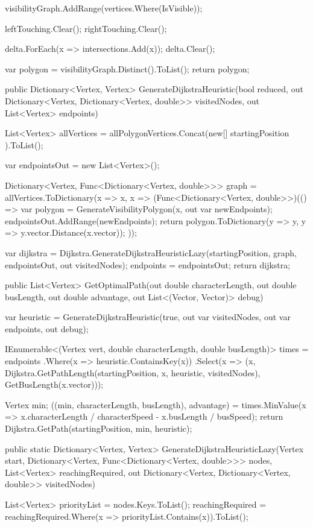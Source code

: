 \documentclass[12pt]{article}
\begin{document}
\begin{Csharp}[caption=class Map]
\begin{Csharp}
{{        visibilityGraph.AddRange(vertices.Where(IsVisible));

        leftTouching.Clear();
        rightTouching.Clear();

        delta.ForEach(x => intersections.Add(x));
        delta.Clear();
    }

    var polygon = visibilityGraph.Distinct().ToList();
    return polygon;
}

public Dictionary<Vertex, Vertex> GenerateDijkstraHeuristic(bool reduced, out Dictionary<Vertex, Dictionary<Vertex, double>> visitedNodes, out List<Vertex> endpoints)
{
    List<Vertex> allVertices = allPolygonVertices.Concat(new[] { startingPosition }).ToList();

    var endpointsOut = new List<Vertex>();

    Dictionary<Vertex, Func<Dictionary<Vertex, double>>> graph =
        allVertices.ToDictionary(x => x, x =>
        (Func<Dictionary<Vertex, double>>)(() =>
            {
                var polygon = GenerateVisibilityPolygon(x, out var newEndpoints);
                endpointsOut.AddRange(newEndpoints);
                return polygon.ToDictionary(y => y, y => y.vector.Distance(x.vector));
            }
        ));

    var dijkstra = Dijkstra.GenerateDijkstraHeuristicLazy(startingPosition, graph, endpointsOut, out visitedNodes);
    endpoints = endpointsOut;
    return dijkstra;
}

public List<Vertex> GetOptimalPath(out double characterLength, out double busLength, out double advantage, out List<(Vector, Vector)> debug)
{
    var heuristic = GenerateDijkstraHeuristic(true, out var visitedNodes, out var endpoints, out debug);

    IEnumerable<(Vertex vert, double characterLength, double busLength)> times = endpoints
        .Where(x => heuristic.ContainsKey(x))
        .Select(x => 
            (x, Dijkstra.GetPathLength(startingPosition, x, heuristic, visitedNodes), GetBusLength(x.vector)));

    Vertex min;
    ((min, characterLength, busLength), advantage) = times.MinValue(x => x.characterLength / characterSpeed - x.busLength / busSpeed);
    return Dijkstra.GetPath(startingPosition, min, heuristic);
}
\end{Csharp}

\begin{Csharp}[caption=class Dijkstra]
public static Dictionary<Vertex, Vertex> GenerateDijkstraHeuristicLazy(Vertex start, Dictionary<Vertex, Func<Dictionary<Vertex, double>>> nodes, List<Vertex> reachingRequired, out Dictionary<Vertex, Dictionary<Vertex, double>> visitedNodes)
{
    List<Vertex> priorityList = nodes.Keys.ToList();
    reachingRequired = reachingRequired.Where(x => priorityList.Contains(x)).ToList();

}
\end{Csharp}
\end{Csharp}
\end{document}
